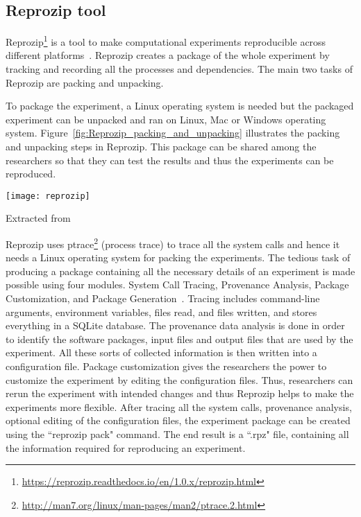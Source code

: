 \subsection{Reprozip tool}
Reprozip\footnote{\url{https://reprozip.readthedocs.io/en/1.0.x/reprozip.html}} is a tool to make computational experiments reproducible across different platforms~\cite{Chirigati:2013:RUP:2482613.2482614}. Reprozip creates a package of the whole experiment by tracking and recording all the processes and dependencies. The main two tasks of Reprozip are packing and unpacking.

To package the experiment, a Linux operating system is needed but the packaged experiment can be unpacked and ran on Linux, Mac or Windows operating system. Figure~\ref{fig:Reprozip_packing_and_unpacking} illustrates the packing and unpacking steps in Reprozip. This package can be shared among the researchers so that they can test the results and thus the experiments can be reproduced.

\begin{center}
\texttt{[image: reprozip]}
\label{fig:Reprozip_packing_and_unpacking}
\caption*{Extracted from \cite{Rampin2016}}
\end{center}

Reprozip uses ptrace\footnote{\url{http://man7.org/linux/man-pages/man2/ptrace.2.html}} (process trace) to trace all the system calls and hence it needs a Linux operating system for packing the experiments. The tedious task of producing a package containing all the necessary details of an experiment is made possible using four modules. System Call Tracing, Provenance Analysis, Package Customization, and Package Generation~\cite{Chirigati:2013:RUP:2482613.2482614}. Tracing includes command-line arguments, environment variables, files read, and files written, and stores everything in a SQLite database. The provenance data analysis is done in order to identify the software packages, input files and output files that are used by the experiment. All these sorts of collected information is then written into a configuration file. Package customization gives the researchers the power to customize the experiment by editing the configuration files. Thus, researchers can rerun the experiment with intended changes and thus Reprozip helps to make the experiments more flexible. After tracing all the system calls, provenance analysis, optional editing of the configuration files, the experiment package can be created using the ``reprozip pack" command. The end result is a ``.rpz" file, containing all the information required for reproducing an experiment.

